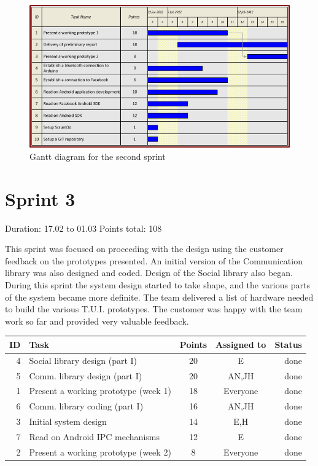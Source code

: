 \begin{figure}[h!]
\centering \includegraphics[scale=0.8]{img/sprints-gantt2.png}
\caption{Gantt diagram for the second sprint}
\label{fig:sprints-gantt2}
\end{figure}

\newpage

\section{Sprint 3}

Duration: 17.02 to 01.03
Points total: 108

This sprint was focused on proceeding with the design using the customer
feedback on the prototypes presented. An initial version of the Communication
library was also designed and coded. Design of the Social library also began.
During this sprint the system design started to take shape, and the various
parts of the system became more definite. The team delivered a list of hardware
needed to build the various T.U.I. prototypes. The customer was happy with the
team work so far and provided very valuable feedback.

\begin{table}[ht!]
\begin{tabular}{ | r | l | c | c | r | }

\hline
\textbf{ID} & \textbf{Task} & \textbf{Points} & \textbf{Assigned to} & \textbf{Status} \\
\hline

 4 & Social library design (part I)					& 20 & E		& done \\
\hline
 5 & Comm. library design (part I)			& 20 & AN,JH	& done \\
\hline
 1 & Present a working prototype (week 1)			& 18 & Everyone & done \\
\hline
 6 & Comm. library coding (part I)			& 16 & AN,JH	& done \\
\hline
 3 & Initial system design							& 14 & E,H		& done \\
\hline
 7 & Read on Android IPC mechanisms					& 12 & E		& done \\
\hline
 2 & Present a working prototype (week 2)			& 8 & Everyone	& done \\
\hline

\end{tabular}
\end{table}

